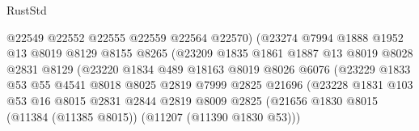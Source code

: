 \begin{lexlean}{RustStd}
\begin{coremodule}
                                  @22549
                                  @22552
                                  @22555
                                  @22559
                                  @22564
                                  @22570)
                                (@23274
                                  @7994
                                  @1888
                                  @1952
                                  @13
                                  @8019
                                  @8129
                                  @8155
                                  @8265
                                  (@23209
                                    @1835
                                    @1861
                                    @1887
                                    @13
                                    @8019
                                    @8028
                                    @2831
                                    @8129
                                    (@23220
                                      @1834
                                      @489
                                      @18163
                                      @8019
                                      @8026
                                      @6076
                                      (@23229
                                        @1833
                                        @53
                                        @55
                                        @4541
                                        @8018
                                        @8025
                                        @2819
                                        @7999
                                        @2825
                                        @21696
                                        (@23228
                                          @1831
                                          @103
                                          @53
                                          @16
                                          @8015
                                          @2831
                                          @2844
                                          @2819
                                          @8009
                                          @2825
                                          (@21656
                                            @1830
                                            @8015
                                            (@11384 (@11385 @8015))
                                            (@11207 (@11390 @1830 @53)))

\end{coremodule}
\end{lexlean}

